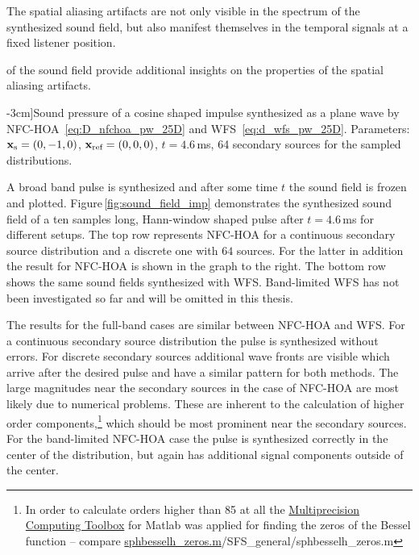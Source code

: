 The spatial aliasing artifacts are not only visible in the spectrum of the
synthesized sound field, but also manifest themselves in the temporal signals at
a fixed listener position.


 of the sound field provide additional insights
on the properties of the spatial aliasing artifacts.
%
\begin{figure*}[tb]
    \small
    
    \caption[][-3cm]{Sound pressure of a cosine shaped impulse synthesized as a
    plane wave by \ac{NFC-HOA}~\protect\eqref{eq:D_nfchoa_pw_25D} and
    \ac{WFS}~\protect\eqref{eq:d_wfs_pw_25D}. Parameters:
    $\mathbf{x}_\text{s} = (0,-1,0)$, $\mathbf{x}_\text{ref} = (0,0,0)$, $t = 4.6$\,ms, 64 secondary sources for
    the sampled distributions.
    }
    \label{fig:sound_field_imp}
\end{figure*}
%
A broad band pulse is synthesized and after some time $t$ the sound
field is frozen and plotted. Figure\,\ref{fig:sound_field_imp} demonstrates the
synthesized sound field of a ten samples long, Hann-window shaped pulse after $t = 4.6$\,ms for
different setups. The top row represents \twohalfD \ac{NFC-HOA} for a continuous
secondary source distribution and a discrete one with $64$ sources. For the
latter in addition the result for \ac{NFC-HOA} is shown in the graph to the
right. The bottom row shows the same sound fields synthesized with \twohalfD
\ac{WFS}.
Band-limited \ac{WFS} has not been investigated so far and will be omitted in this
thesis.

The results for the full-band cases are similar
between \ac{NFC-HOA} and \ac{WFS}. For a continuous secondary source distribution the
pulse is synthesized without errors.
For discrete secondary sources additional wave fronts
are visible which arrive after the desired pulse and have a similar pattern for
both methods.
The large magnitudes near the secondary sources in the case of \ac{NFC-HOA} are
most likely due to numerical problems. These are inherent to the calculation of
higher order components,\footnote{In order to calculate orders higher than 85 at
all the \href{http://www.advanpix.com/}{\color{link}Multiprecision Computing
Toolbox}
for
Matlab was applied for finding the zeros of the Bessel function -- compare
\url{sphbesselh\_zeros.m}{\SFS/SFS\_general/sphbesselh\_zeros.m}}
which should be most prominent near the
secondary sources.
For the band-limited \ac{NFC-HOA} case the pulse is synthesized
correctly in the center of the distribution, but again has additional signal
components outside of the center.

